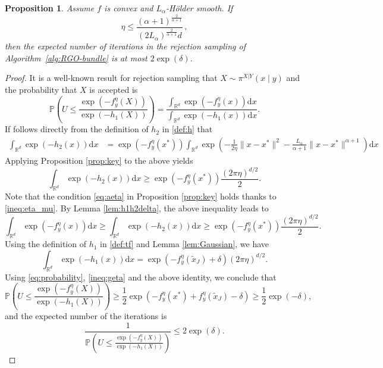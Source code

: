\documentclass[11pt,letterpaper]{article}
\newtheorem{proposition}[thm]{Proposition}
\newcommand{\R}{\mathbb{R}}
\newcommand{\tx}{\tilde x}
\newcommand{\rd}{\mathrm{d}}
\begin{document}
\begin{proposition}\label{prop:expected}
Assume $f$ is convex and $L_\alpha$-Hölder smooth. 
If 
\begin{equation}\label{ineq:eta_mu}
    \eta \le \frac{(\alpha+1)^{\frac{2}{\alpha+1}}}{(2L_\alpha)^{\frac{2}{\alpha+1}}d}\,,
\end{equation}
then the expected number of iterations in the rejection sampling of Algorithm~\ref{alg:RGO-bundle} is at most $2\exp( \delta)$.
\end{proposition}

\begin{proof}
It is a well-known result for rejection sampling that $X \sim \pi^{X|Y}(x\mid y)$ and the probability that $X$ is accepted is
\begin{equation}\label{eq:probability}
    \mathbb{P}\left(U \leq \frac{\exp(-f_y^\eta(X))}{\exp(-h_1(X))}\right) 
=\frac{\int_{\R^d} \exp(-f_y^\eta(x)) \rd x}{\int_{\R^d} \exp(-h_1(x)) \rd x}.
\end{equation}
If follows directly from the definition of $h_2$ in \eqref{def:h} that 
\begin{align*}
    \int_{\R^d} \exp(-h_2(x)) \rd x &= \exp(-f_y^\eta(x^*)) \int_{\R^d} \exp\left(-\frac{1}{2\eta}\|x-x^*\|^2 -  \frac{L_\alpha}{\alpha+1}\|x-x^*\|^{\alpha+1}\right) \rd x 
\end{align*}
Applying Proposition \ref{prop:key} to the above yields
    \[
        \int_{\R^d} \exp(-h_2(x)) \rd x \ge \exp(-f_y^\eta(x^*)) \frac{(2\pi \eta)^{d/2}}{2}.
    \]
Note that the condition \eqref{eq:aeta} in Proposition \ref{prop:key} holds thanks to \eqref{ineq:eta_mu}.
By Lemma \ref{lem:h1h2delta}, the above inequality leads to 
\begin{equation}\label{ineq:geta}
    \int_{\R^d} \exp(-f_y^\eta(x)) \rd x \ge
\int_{\R^d} \exp(-h_2(x)) \rd x \ge \exp(-f_y^\eta(x^*)) \frac{(2\pi\eta)^{d/2}}2.
\end{equation}
Using the definition of $h_1$ in \eqref{def:tf} and Lemma \ref{lem:Gaussian}, we have
\begin{equation}\label{eq:h1}
    \int_{\R^d} \exp(-h_1(x)) \rd x 
= \exp\left( -f_y^\eta(\tx_J) + \delta \right) (2\pi \eta)^{d/2}.
\end{equation}
Using \eqref{eq:probability}, \eqref{ineq:geta} and the above identity, we conclude that
\[
    \mathbb{P}\left(U \leq \frac{\exp(-f_y^\eta(X))}{\exp(-h_1(X))}\right)
    \ge \frac12 \exp(-f_y^\eta(x^*)+f_y^\eta(\tx_J)-\delta) 
    \ge \frac12 \exp(-\delta),
\]
and the expected number of the iterations is
\[
\frac{1}{\mathbb{P}\left(U \leq \frac{\exp(-f_y^\eta(X))}{\exp(-h_1(X))}\right)}
\le 2\exp(\delta).
\]
\end{proof}
\end{document}
